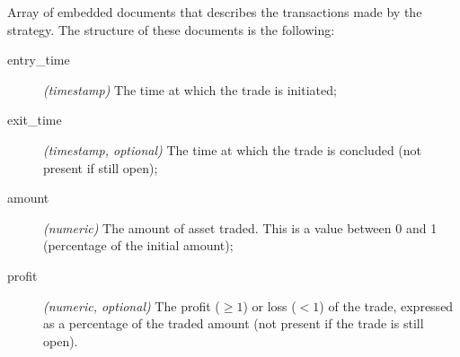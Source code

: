 \begin{description}
\begin{description}
\begin{description}
						Array of embedded documents that
						describes the transactions made
						by the strategy. The structure
						of these documents is the
						following:
						\begin{description}
							\item[entry\_time]
								\textit{(timestamp)}
								The time at
								which the trade
								is initiated;
							\item[exit\_time]
								\textit{(timestamp,
								optional)}
								The time at
								which the trade
								is concluded
								(not present if
								still open);
							\item[amount]
								\textit{(numeric)}
								The amount of
								asset traded.
								This is a value
								between 0 and 1
								(percentage of
								the initial
								amount);
							\item[profit]
								\textit{(numeric,
								optional)} The
								profit (\(\ge
								1\)) or loss
								(\(< 1\)) of the
								trade, expressed
								as a percentage
								of the traded
								amount (not
								present if the
								trade is still
								open).
						\end{description}
				\end{description}
		\end{description}
\end{description}
